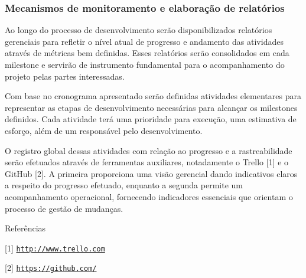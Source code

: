 \subsubsection*{Mecanismos de monitoramento e elaboração de relatórios }

Ao longo do processo de desenvolvimento serão disponibilizados relatórios gerenciais para refletir o nível atual de progresso e andamento das atividades através de métricas bem definidas. Esses relatórios serão consolidados em cada milestone e servirão de instrumento fundamental para o acompanhamento do projeto pelas partes interessadas.

Com base no cronograma apresentado serão definidas atividades elementares para representar as etapas de desenvolvimento necessárias para alcançar os milestones definidos. Cada atividade terá uma prioridade para execução, uma estimativa de esforço, além de um responsável pelo desenvolvimento.

O registro global dessas atividades com relação ao progresso e a rastreabilidade serão efetuados através de ferramentas auxiliares, notadamente o Trello \mbox{[}1\mbox{]} e o Git\+Hub \mbox{[}2\mbox{]}. A primeira proporciona uma visão gerencial dando indicativos claros a respeito do progresso efetuado, enquanto a segunda permite um acompanhamento operacional, fornecendo indicadores essenciais que orientam o processo de gestão de mudanças.

Referências

\mbox{[}1\mbox{]} \href{http://www.trello.com}{\tt http\+://www.\+trello.\+com}

\mbox{[}2\mbox{]} \href{https://github.com/}{\tt https\+://github.\+com/} 